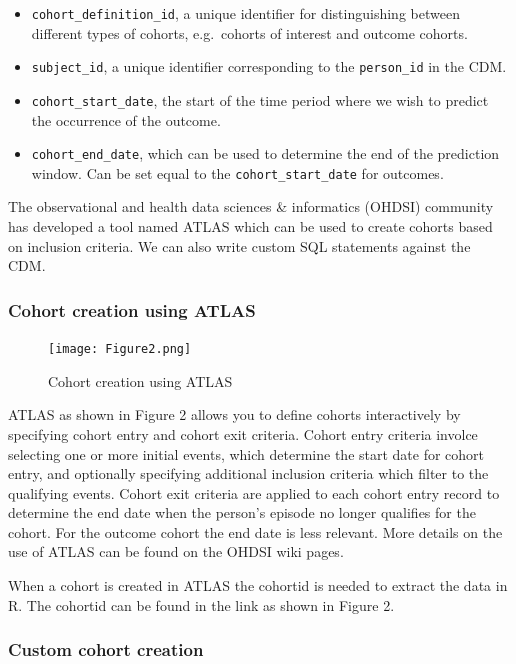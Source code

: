 \documentclass[]{article}
\providecommand{\tightlist}{%
  \setlength{\itemsep}{0pt}\setlength{\parskip}{0pt}}
\begin{document}
\begin{itemize}
\tightlist
\item
  \texttt{cohort\_definition\_id}, a unique identifier for
  distinguishing between different types of cohorts, e.g.~cohorts of
  interest and outcome cohorts.
\item
  \texttt{subject\_id}, a unique identifier corresponding to the
  \texttt{person\_id} in the CDM.
\item
  \texttt{cohort\_start\_date}, the start of the time period where we
  wish to predict the occurrence of the outcome.
\item
  \texttt{cohort\_end\_date}, which can be used to determine the end of
  the prediction window. Can be set equal to the
  \texttt{cohort\_start\_date} for outcomes.
\end{itemize}

The observational and health data sciences \& informatics (OHDSI)
community has developed a tool named ATLAS which can be used to create
cohorts based on inclusion criteria. We can also write custom SQL
statements against the CDM.

\subsubsection{Cohort creation using
ATLAS}\label{cohort-creation-using-atlas}

\begin{figure}
\centering
\texttt{[image: Figure2.png]}
\caption{Cohort creation using ATLAS}
\end{figure}

ATLAS as shown in Figure 2 allows you to define cohorts interactively by
specifying cohort entry and cohort exit criteria. Cohort entry criteria
involce selecting one or more initial events, which determine the start
date for cohort entry, and optionally specifying additional inclusion
criteria which filter to the qualifying events. Cohort exit criteria are
applied to each cohort entry record to determine the end date when the
person's episode no longer qualifies for the cohort. For the outcome
cohort the end date is less relevant. More details on the use of ATLAS
can be found on the OHDSI wiki pages.

When a cohort is created in ATLAS the cohortid is needed to extract the
data in R. The cohortid can be found in the link as shown in Figure 2.

\subsubsection{Custom cohort creation}\label{custom-cohort-creation}
\end{document}
